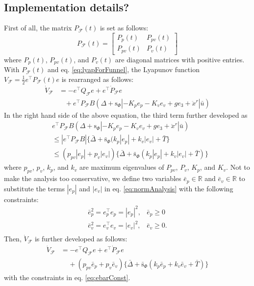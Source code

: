 \documentclass[letterpaper, 10 pt, conference]{ieeeconf}  %
\begin{document}
\subsection{Implementation details?}
First of all, the matrix $P_\mathcal{F}(t)$ is set as follows:
\begin{equation}
P_\mathcal{F}(t) = \left[
\begin{array}{cc}
P_p(t) & P_{pv}(t) \\
P_{pv}(t) & P_v(t)
\end{array}
\right] \nonumber
\end{equation}
where $P_p(t)$, $P_{pv}(t)$, and $P_v(t)$ are diagonal matrices with positive entries.
With $P_\mathcal{F}(t)$ and eq. \eqref{eq:lyapForFunnel}, the Lyapunov function $V_\mathcal{F} = \frac{1}{2}e^\intercal P_\mathcal{F}(t) e$ is rearranged as follows: 
\begin{align}
\dot{V}_\mathcal{F} &= -e^\intercal Q_\mathcal{F} e + e^\intercal \dot{P}_\mathcal{F} e\nonumber \\
&\;\;\;+e^\intercal P_\mathcal{F} B(\Delta+\text{s}_\Phi|-K_pe_p -K_ve_v + ge_3 + \ddot{x}^r|\bar{u}) \nonumber
\end{align}
In the right hand side of the above equation, the third term further developed as
\begin{align}
&e^\intercal P_\mathcal{F} B(\Delta+\text{s}_\Phi|-K_p e_p -K_v e_v + ge_3 + \ddot{x}^r|\bar{u}) \nonumber \\
&\leq |e^\intercal P_\mathcal{F}B|\{\bar{\Delta} + \bar{\text{s}}_\Phi(k_p|e_p| + k_v|e_v| + \bar{T}\} \nonumber \\
&\leq (p_{pv}|e_p|+p_v|e_v|)\{\bar{\Delta}+\bar{\text{s}}_\Phi(k_p|e_p|+k_v|e_v|+\bar{T})\} \label{eq:normAnalysis}
\end{align}
where $p_{pv}$, $p_v$, $k_p$, and $k_v$ are maximum eigenvalues of $P_{pv}$, $P_v$, $K_p$, and $K_v$.
Not to make the analysis too conservative, 
we define two variables $\bar{e}_p\in\mathbb{R}$ and $\bar{e}_v\in\mathbb{R}$ to substitute the terms $|e_p|$ and $|e_v|$ in eq. \eqref{eq:normAnalysis} with the following constraints:
\begin{equation}
\begin{array}{ll}
\bar{e}_p^2 = e_p^\intercal e_p = |e_p|^2, & \bar{e}_p \geq 0 \\
\bar{e}_v^2 = e_v^\intercal e_v = |e_v|^2, & \bar{e}_v \geq 0. \\
\end{array} \label{eq:ebarConst} 
\end{equation} 
Then, $\dot{V}_\mathcal{F}$ is further developed as follows:
\begin{align}
\dot{V}_\mathcal{F} &= -e^\intercal Q_\mathcal{F} e + e^\intercal \dot{P}_\mathcal{F}e \label{eq:vdot} \\
 &\;\;\;\;+(p_{pv}\bar{e}_p+p_v\bar{e}_v)\{\bar{\Delta} + \bar{\text{s}}_\Phi(k_p\bar{e}_p+k_v\bar{e}_v + \bar{T})\} \nonumber 
\end{align}
with the constraints in eq. \eqref{eq:ebarConst}.
\end{document}
